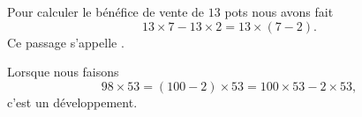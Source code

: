 \begin{example}
    Pour calculer le bénéfice de vente de \( 13\) pots nous avons fait
    \begin{equation}
        13\times 7-13\times 2=13\times (7-2).
    \end{equation}
    Ce passage s'appelle .
\end{example}

\begin{example}
    Lorsque nous faisons
    \begin{equation}
        98\times 53=(100-2)\times 53=100\times 53-2\times 53,
    \end{equation}
    c'est un développement.
\end{example}


